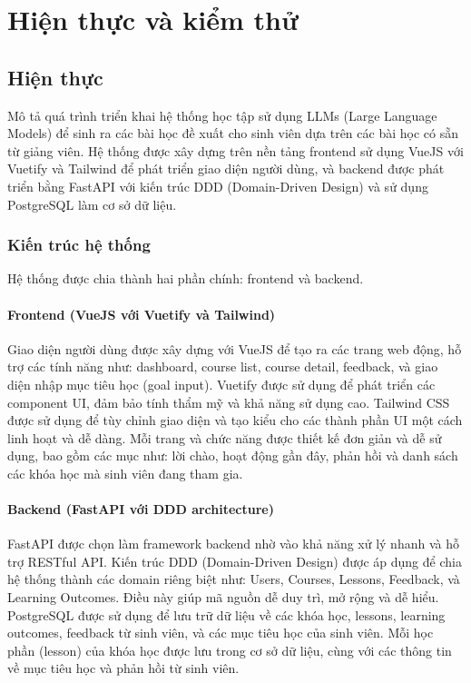 \chapter{Hiện thực và kiểm thử}
\section{Hiện thực}

Mô tả quá trình triển khai hệ thống học tập sử dụng LLMs (Large Language Models) để sinh ra các bài học đề xuất cho sinh viên dựa trên các bài học có sẵn từ giảng viên. Hệ thống được xây dựng trên nền tảng frontend sử dụng VueJS với Vuetify và Tailwind để phát triển giao diện người dùng, và backend được phát triển bằng FastAPI với kiến trúc DDD (Domain-Driven Design) và sử dụng PostgreSQL làm cơ sở dữ liệu.

\subsection{Kiến trúc hệ thống}

Hệ thống được chia thành hai phần chính: frontend và backend.

\subsubsection{Frontend (VueJS với Vuetify và Tailwind)}

Giao diện người dùng được xây dựng với VueJS để tạo ra các trang web động, hỗ trợ các tính năng như: dashboard, course list, course detail, feedback, và giao diện nhập mục tiêu học (goal input). Vuetify được sử dụng để phát triển các component UI, đảm bảo tính thẩm mỹ và khả năng sử dụng cao. Tailwind CSS được sử dụng để tùy chỉnh giao diện và tạo kiểu cho các thành phần UI một cách linh hoạt và dễ dàng. Mỗi trang và chức năng được thiết kế đơn giản và dễ sử dụng, bao gồm các mục như: lời chào, hoạt động gần đây, phản hồi và danh sách các khóa học mà sinh viên đang tham gia.

\subsubsection{Backend (FastAPI với DDD architecture)}

FastAPI được chọn làm framework backend nhờ vào khả năng xử lý nhanh và hỗ trợ RESTful API. Kiến trúc DDD (Domain-Driven Design) được áp dụng để chia hệ thống thành các domain riêng biệt như: Users, Courses, Lessons, Feedback, và Learning Outcomes. Điều này giúp mã nguồn dễ duy trì, mở rộng và dễ hiểu. PostgreSQL được sử dụng để lưu trữ dữ liệu về các khóa học, lessons, learning outcomes, feedback từ sinh viên, và các mục tiêu học của sinh viên. Mỗi học phần (lesson) của khóa học được lưu trong cơ sở dữ liệu, cùng với các thông tin về mục tiêu học và phản hồi từ sinh viên.

